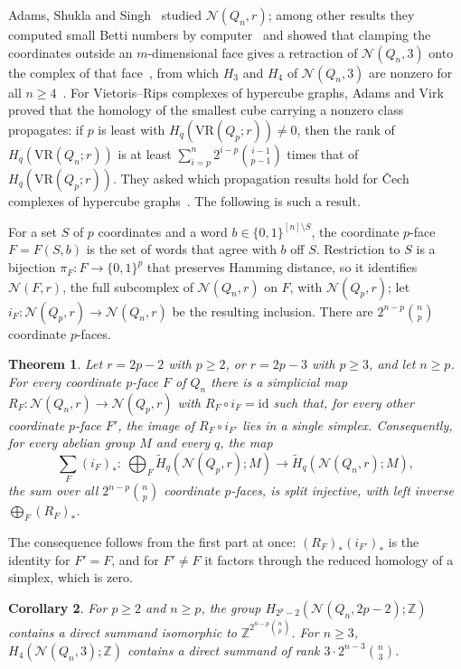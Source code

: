 \documentclass[11pt]{amsart}
\newtheorem{theorem}{Theorem}[section]
\newtheorem{corollary}[theorem]{Corollary}
\theoremstyle{remark}
\newcommand{\N}{\mathcal{N}}
\begin{document}
Adams, Shukla and Singh~\cite{ASS} studied $\N(Q_n,r)$; among other results they computed small Betti numbers by
computer~\cite[Table~1]{ASS} and showed that clamping the coordinates outside an $m$-dimensional face gives a retraction
of $\N(Q_n,3)$ onto the complex of that face~\cite[Lemma~5.7]{ASS}, from which $H_3$ and $H_4$ of $\N(Q_n,3)$ are
nonzero for all $n\ge4$~\cite[Theorem~5.13]{ASS}. For Vietoris--Rips complexes of hypercube graphs, Adams and
Virk~\cite[Theorem~6.4]{AV} proved that the homology of the smallest cube carrying a nonzero class propagates: if $p$ is
least with $H_q(\mathrm{VR}(Q_p;r))\ne0$, then the rank of $H_q(\mathrm{VR}(Q_n;r))$ is at least
$\sum_{i=p}^n2^{i-p}\binom{i-1}{p-1}$ times that of $H_q(\mathrm{VR}(Q_p;r))$. They asked which propagation results
hold for \v{C}ech complexes of hypercube graphs~\cite[Question~8.8]{AV}. The following is such a result.

For a set $S$ of $p$ coordinates and a word $b\in\{0,1\}^{[n]\setminus S}$, the coordinate $p$-face $F=F(S,b)$ is the
set of words that agree with $b$ off $S$. Restriction to $S$ is a bijection $\pi_F\colon F\to\{0,1\}^p$ that preserves
Hamming distance, so it identifies $\N(F,r)$, the full subcomplex of $\N(Q_n,r)$ on $F$, with $\N(Q_p,r)$; let
$i_F\colon\N(Q_p,r)\to\N(Q_n,r)$ be the resulting inclusion. There are $2^{n-p}\binom np$ coordinate $p$-faces.

\begin{theorem}\label{thm:main}
Let $r=2p-2$ with $p\ge2$, or $r=2p-3$ with $p\ge3$, and let $n\ge p$. For every coordinate $p$-face $F$ of $Q_n$ there
is a simplicial map $R_F\colon\N(Q_n,r)\to\N(Q_p,r)$ with $R_F\circ i_F=\mathrm{id}$ such that, for every other
coordinate $p$-face $F'$, the image of $R_F\circ i_{F'}$ lies in a single simplex. Consequently, for every abelian group
$M$ and every $q$, the map
\[
\sum_F (i_F)_*\colon\ \bigoplus_F\widetilde H_q(\N(Q_p,r);M)\to\widetilde H_q(\N(Q_n,r);M),
\]
the sum over all $2^{n-p}\binom np$ coordinate $p$-faces, is split injective, with left inverse $\bigoplus_F(R_F)_*$.
\end{theorem}

The consequence follows from the first part at once: $(R_F)_*(i_{F'})_*$ is the identity for $F'=F$, and for $F'\ne F$
it factors through the reduced homology of a simplex, which is zero.

\begin{corollary}\label{cor:rank}
For $p\ge2$ and $n\ge p$, the group $H_{2^p-2}(\N(Q_n,2p-2);\mathbb Z)$ contains a direct summand isomorphic to
$\mathbb Z^{2^{n-p}\binom np}$. For $n\ge3$, $H_4(\N(Q_n,3);\mathbb Z)$ contains a direct summand of rank
$3\cdot2^{n-3}\binom n3$.
\end{corollary}
\end{document}
